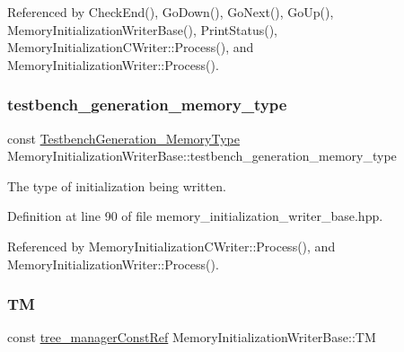 Referenced by Check\+End(), Go\+Down(), Go\+Next(), Go\+Up(), Memory\+Initialization\+Writer\+Base(), Print\+Status(), Memory\+Initialization\+C\+Writer\+::\+Process(), and Memory\+Initialization\+Writer\+::\+Process().

\mbox{\label{classMemoryInitializationWriterBase_ac4f718dfd59eddbc0adf75e98b227ccb}} 
\subsubsection{\texorpdfstring{testbench\+\_\+generation\+\_\+memory\+\_\+type}{testbench\_generation\_memory\_type}}
{\footnotesize\ttfamily const \hyperlink{testbench__generation_8hpp_ad84688161fffbe7da2fc2b9a39b93198}{Testbench\+Generation\+\_\+\+Memory\+Type} Memory\+Initialization\+Writer\+Base\+::testbench\+\_\+generation\+\_\+memory\+\_\+type\hspace{0.3cm}{\ttfamily [protected]}}



The type of initialization being written. 



Definition at line 90 of file memory\+\_\+initialization\+\_\+writer\+\_\+base.\+hpp.



Referenced by Memory\+Initialization\+C\+Writer\+::\+Process(), and Memory\+Initialization\+Writer\+::\+Process().

\mbox{\label{classMemoryInitializationWriterBase_ad7639a9140b8d5c42c2c0c4255ad4cbf}} 
\subsubsection{\texorpdfstring{TM}{TM}}
{\footnotesize\ttfamily const \hyperlink{tree__manager_8hpp_a792e3f1f892d7d997a8d8a4a12e39346}{tree\+\_\+manager\+Const\+Ref} Memory\+Initialization\+Writer\+Base\+::\+TM\hspace{0.3cm}{\ttfamily [protected]}}



